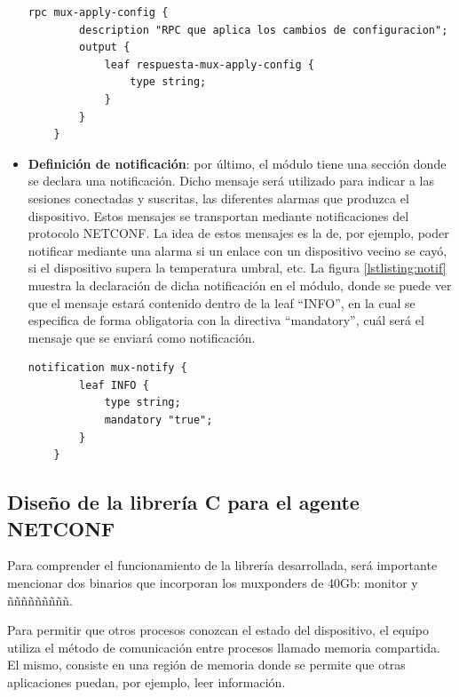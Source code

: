 \begin{itemize}
    \begin{lstlisting}[language=SHELXL, caption=Declaración de RPC., label=lstlisting:RPC]
    rpc mux-apply-config {        
        description "RPC que aplica los cambios de configuracion";
        output {
            leaf respuesta-mux-apply-config {
                type string;
            }
        }
    }
    \end{lstlisting}

    \item \textbf{Definición de notificación}: por último, el módulo tiene una sección donde se declara una notificación. Dicho mensaje será utilizado para indicar a las sesiones conectadas y suscritas, las diferentes alarmas que produzca el dispositivo. Estos mensajes se transportan mediante notificaciones del protocolo NETCONF.  La idea de estos mensajes es la de, por ejemplo, poder notificar mediante una alarma si un enlace con un dispositivo vecino se cayó, si el dispositivo supera la temperatura umbral, etc. La figura \ref{lstlisting:notif} muestra la declaración de dicha notificación en el módulo, donde se puede ver que el mensaje estará contenido dentro de la leaf “INFO”, en la cual se especifica de forma obligatoria con la directiva “mandatory”, cuál será el mensaje que se enviará como notificación.
    
    \newpage

    \begin{lstlisting}[language=SHELXL, caption=Declaración de notificación., label=lstlisting:notif]
    notification mux-notify {
        leaf INFO {
            type string;
            mandatory "true";
        }
    }
    \end{lstlisting}

\end{itemize}

\subsection{Diseño de la librería C para el agente NETCONF}
Para comprender el funcionamiento de la librería desarrollada, será importante mencionar dos binarios que incorporan los muxponders de 40Gb: monitor y ñññññññññ. 

Para permitir que otros procesos conozcan el estado del dispositivo, el equipo utiliza el método de comunicación entre procesos llamado memoria compartida. El mismo, consiste en una región de memoria donde se permite que otras aplicaciones puedan, por ejemplo, leer información. 


